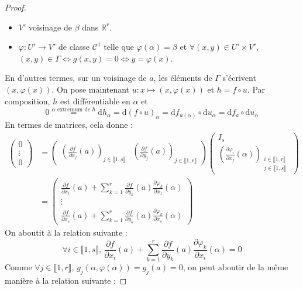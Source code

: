 \begin{proof}
\begin{itemize}
			\item $V'$ voisinage de $\beta$ dans $\mathbb{R}^r$.
			\item $\varphi : U' \rightarrow V'$ de classe $\mathcal{C}^1$ telle que $\varphi(\alpha) = \beta$ et $\forall (x, y) \in U' \times V'$, $(x, y) \in \Gamma \iff g(x, y) = 0 \iff y = \varphi(x)$.
		\end{itemize}
		En d'autres termes, sur un voisinage de $a$, les éléments de $\Gamma$ s'écrivent $(x, \varphi(x))$. On pose maintenant $u : x \mapsto (x, \varphi(x))$ et $h = f \circ u$. Par composition, $h$ est différentiable en $\alpha$ et
		\[ 0 \overset{\alpha \text{ extremum de } h}{=} \mathrm{d}h_\alpha = \mathrm{d}(f \circ u)_\alpha = \mathrm{d}f_{u(\alpha)} \circ \mathrm{d}u_\alpha = \mathrm{d}f_a \circ \mathrm{d}u_\alpha \]
		En termes de matrices, cela donne :
		\begin{align*}
			\begin{pmatrix} 0 \\ \vdots \\ 0 \end{pmatrix} &= \begin{pmatrix} \left( \frac{\partial f}{\partial x_j}(a) \right)_{j \in \llbracket 1, s \rrbracket} & \left( \frac{\partial f}{\partial y_j}(a) \right)_{j \in \llbracket 1, r \rrbracket} \end{pmatrix} \begin{pmatrix} I_s \\ \left( \frac{\partial \varphi_i}{\partial x_j}(\alpha) \right)_{\substack{i \in \llbracket 1, r \rrbracket \\ j \in \llbracket 1, s \rrbracket}} \end{pmatrix} \\
			&= \begin{pmatrix} \frac{\partial f}{\partial x_1}(a) + \sum_{k=1}^r \frac{\partial f}{\partial y_k}(a) \frac{\partial \varphi_k}{\partial x_1}(\alpha) \\ \vdots \\ \frac{\partial f}{\partial x_s}(a) + \sum_{k=1}^r \frac{\partial f}{\partial y_k}(a) \frac{\partial \varphi_k}{\partial x_s}(\alpha) \end{pmatrix}
		\end{align*}
		On aboutit à la relation suivante :
		\[ \forall i \in \llbracket 1, s \rrbracket, \, \frac{\partial f}{\partial x_i}(a) + \sum_{k=1}^r \frac{\partial f}{\partial y_k}(a) \frac{\partial \varphi_k}{\partial x_i}(\alpha) = 0 \tag{$**$} \]
		Comme $\forall j \in \llbracket 1, r \rrbracket$, $g_j(\alpha, \varphi(\alpha)) = g_j(a) = 0$, on peut aboutir de la même manière à la relation suivante :

\end{proof}
